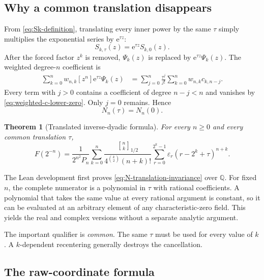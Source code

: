 \documentclass[11pt]{article}
\newtheorem{theorem}{Theorem}[section]
\theoremstyle{definition}
\newcommand{\Q}{\mathbb{Q}}
\newcommand{\Fabius}{F}
\newcommand{\eps}{\varepsilon}
\newcommand{\Qbin}[3]{\genfrac{[}{]}{0pt}{}{#1}{#2}_{#3}}
\newcommand{\coeff}[2]{\left[#1\right]#2}
\newcommand{\e}{\mathrm{e}}
\begin{document}
\subsection{Why a common translation disappears}

From \cref{eq:Sk-definition}, translating every inner power by the same $\tau$ simply multiplies the exponential series by $\e^{\tau z}$:
\begin{equation}
  S_{k,\tau}(z)=\e^{\tau z}S_{k,0}(z).
  \label{eq:translation-exponential}
\end{equation}
After the forced factor $z^k$ is removed, $\Psi_k(z)$ is replaced by $\e^{\tau z}\Psi_k(z)$.  The weighted degree-$n$ coefficient is
\begin{align}
  \sum_{k=0}^{n}w_{n,k}\coeff{z^n}{\e^{\tau z}\Psi_k(z)}
  &=\sum_{j=0}^{n}\frac{\tau^j}{j!}
    \sum_{k=0}^{n}w_{n,k}c_{k,n-j}.
  \label{eq:translation-coefficient-convolution}
\end{align}
Every term with $j>0$ contains a coefficient of degree $n-j<n$ and vanishes by \cref{eq:weighted-c-lower-zero}.  Only $j=0$ remains.  Hence
\begin{equation}
  N_n(\tau)=N_n(0).
  \label{eq:N-translation-invariance}
\end{equation}

\begin{theorem}[Translated inverse-dyadic formula]
For every $n\ge0$ and every common translation $\tau$,
\begin{equation}
\boxed{
  \Fabius(2^{-n})
  =\frac{1}{2^{n^2}P_n}
    \sum_{k=0}^{n}
    \frac{\Qbin{n}{k}{1/2}}
         {4^{\binom{k}{2}}(n+k)!}
    \sum_{r=0}^{2^k-1}
      \eps_r(r-2^k+\tau)^{n+k}.}
  \label{eq:translated-inverse-dyadic}
\end{equation}
\end{theorem}

The Lean development first proves \cref{eq:N-translation-invariance} over $\Q$.  For fixed $n$, the complete numerator is a polynomial in $\tau$ with rational coefficients.  A polynomial that takes the same value at every rational argument is constant, so it can be evaluated at an arbitrary element of any characteristic-zero field.  This yields the real and complex versions without a separate analytic argument.

The important qualifier is \emph{common}.  The same $\tau$ must be used for every value of $k$.  A $k$-dependent recentering generally destroys the cancellation.

\subsection{The raw-coordinate formula}
\end{document}
